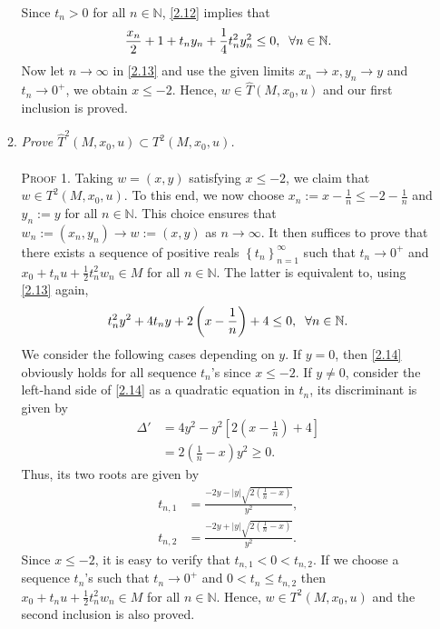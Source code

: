 \documentclass[a4paper]{article}
\numberwithin{equation}{section}
\begin{document}
\begin{enumerate}
\begin{enumerate}
\begin{align}
\end{align}
Since $t_n>0$ for all $n\in \mathbb{N}$, \eqref{2.12} implies that
\begin{align}
\label{2.13}
\frac{{{x_n}}}{2} + 1 + {t_n}{y_n} + \frac{1}{4}t_n^2y_n^2 \le 0,\hspace{0.2cm} \forall n \in \mathbb{N}.
\end{align}
Now let $n\to \infty$ in \eqref{2.13} and use the given limits $x_n\to x,y_n\to y$ and $t_n\to 0^+$, we obtain $x\le -2$. Hence, $w\in \widehat{T}\left(M,x_0,u\right)$ and our first inclusion is proved.
\item \textit{Prove ${\widehat T^2}\left( {M,{x_0},u} \right) \subset {T^2}\left( {M,{x_0},u} \right)$.}\\
\\
\textsc{Proof 1.} Taking $w=\left(x,y\right)$ satisfying $x\le -2$, we claim that $w\in T^2\left(M,x_0,u\right)$. To this end, we now choose $x_n:=x-\frac{1}{n}\le -2 -\frac{1}{n}$ and $y_n:=y$ for all $n\in \mathbb{N}$. This choice ensures that $w_n:=\left(x_n,y_n\right) \to w:=\left(x,y\right)$ as $n\to \infty$. It then suffices to prove that there exists a sequence of positive reals $\left\{ {{t_n}} \right\}_{n = 1}^\infty $ such that $t_n\to 0^+$ and ${x_0} + {t_n}u + \frac{1}{2}t_n^2{w_n} \in M$ for all $n\in \mathbb{N}$. The latter is equivalent to, using \eqref{2.13} again,
\begin{align}
\label{2.14}
t_n^2{y^2} + 4{t_n}y + 2\left( {x - \frac{1}{n}} \right) + 4 \le 0,\hspace{0.2cm}\forall n \in \mathbb{N}.
\end{align}
We consider the following cases depending on $y$. If $y=0$, then \eqref{2.14} obviously holds for all sequence $t_n$'s since $x\le -2$. If $y\ne 0$, consider the left-hand side of \eqref{2.14} as a quadratic equation in $t_n$, its discriminant is given by
\begin{align}
\Delta ' &= 4{y^2} - {y^2}\left[ {2\left( {x - \frac{1}{n}} \right) + 4} \right]\\
 &= 2\left( {\frac{1}{n} - x} \right){y^2} \ge 0.
\end{align}
Thus, its two roots are given by
\begin{align}
{t_{n,1}} &= \frac{{ - 2y - \left| y \right|\sqrt {2\left( {\frac{1}{n} - x} \right)} }}{{{y^2}}},\\
{t_{n,2}} &= \frac{{ - 2y + \left| y \right|\sqrt {2\left( {\frac{1}{n} - x} \right)} }}{{{y^2}}}.
\end{align}
Since $x\le -2$, it is easy to verify that $t_{n,1}<0<t_{n,2}$. If we choose a sequence $t_n$'s such that $t_n\to 0^+$ and $0 < {t_n} \le {t_{n,2}}$ then ${x_0} + {t_n}u + \frac{1}{2}t_n^2{w_n} \in M$  for all $n\in \mathbb{N}$. Hence, $w\in T^2\left(M,x_0,u\right)$ and the second inclusion is also proved.\\

\end{enumerate}
\end{enumerate}
\end{document}
